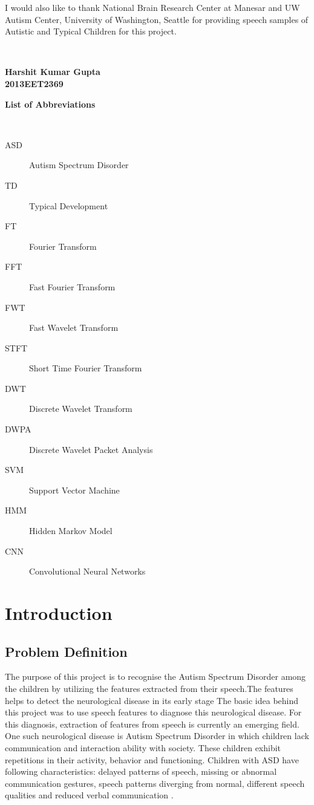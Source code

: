 \documentclass[11pt]{report}
\begin{document}
I would also like to thank National Brain Research Center at Manesar and UW Autism Center, University of Washington, Seattle for providing speech samples of Autistic and Typical Children for this project.



\begin{verbatim}
 

\end{verbatim}
\textbf{Harshit Kumar Gupta}\\
\textbf{2013EET2369}
\newpage


\tableofcontents
\listoffigures
\newpage
\begin{center}
\Large\bf{List of Abbreviations}\\
 \end{center}
\begin{verbatim}
 

\end{verbatim}
\begin{description}
 \item[ASD] Autism Spectrum Disorder
 \item[TD] Typical Development
 \item[FT] Fourier Transform
 \item[FFT] Fast Fourier Transform
 \item[FWT] Fast Wavelet Transform
 \item[STFT] Short Time Fourier Transform
 \item[DWT] Discrete Wavelet Transform
 \item[DWPA] Discrete Wavelet Packet Analysis
 \item[SVM] Support Vector Machine
 \item[HMM] Hidden Markov Model
 \item[CNN] Convolutional Neural Networks 
\end{description}

\newpage
{}
\chapter{Introduction}
\section{Problem Definition}
The purpose of this project is to recognise the Autism Spectrum Disorder among the children by utilizing the features extracted from their speech.The features helps to detect the neurological disease in its early stage
 The basic idea behind this project was to use speech features to diagnose this neurological disease. For this diagnosis, extraction of features from speech is currently an emerging field. One such neurological disease is Autism Spectrum Disorder in which children lack  communication and interaction ability with society. These children exhibit repetitions in their activity, behavior and functioning. Children with ASD have following characteristics: delayed patterns of speech, missing or abnormal communication gestures, speech patterns diverging from normal, different speech qualities and reduced verbal communication \cite{motor}.\\
\end{document}
